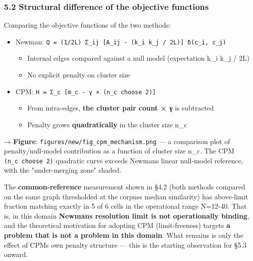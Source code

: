 \documentclass[
]{article}
\providecommand{\tightlist}{%
  \setlength{\itemsep}{0pt}\setlength{\parskip}{0pt}}
\begin{document}
\subsubsection{5.2 Structural difference of the objective
functions}\label{52-structural-difference-of-the-objective-functions}

Comparing the objective functions of the two methods:

\begin{itemize}
\tightlist
\item
  Newman:
  \texttt{Q\ =\ (1/2L)\ Σ\_ij\ {[}A\_ij\ -\ (k\_i\ k\_j\ /\ 2L){]}\ δ(c\_i,\ c\_j)}

  \begin{itemize}
  \tightlist
  \item
    Internal edges compared against a null model (expectation k\_i k\_j
    / 2L)
  \item
    No explicit penalty on cluster size
  \end{itemize}
\item
  CPM: \texttt{H\ =\ Σ\_c\ {[}m\_c\ -\ γ\ ×\ (n\_c\ choose\ 2){]}}

  \begin{itemize}
  \tightlist
  \item
    From intra-edges, \textbf{the cluster pair count × γ} is subtracted
  \item
    Penalty grows \textbf{quadratically} in the cluster size n\_c
  \end{itemize}
\end{itemize}

→ \textbf{Figure}: \texttt{figures/new/fig\_cpm\_mechanism.png} --- a
comparison plot of penalty/null-model contribution as a function of
cluster size n\_c. The CPM \texttt{(n\_c\ choose\ 2)} quadratic curve
exceeds Newman\textquotesingle s linear null-model reference, with the
"under-merging zone" shaded.

The \textbf{common-reference} measurement shown in §4.2 (both methods
compared on the same graph thresholded at the corpus\textquotesingle s
median similarity) has above-limit fraction matching exactly in 5 of 6
cells in the operational range N=12-40. That is, in this domain
\textbf{Newman\textquotesingle s resolution limit is not operationally
binding}, and the theoretical motivation for adopting CPM
(limit-freeness) targets \textbf{a problem that is not a problem in this
domain}. What remains is only the effect of CPM\textquotesingle s own
penalty structure --- this is the starting observation for §5.3 onward.
\end{document}
